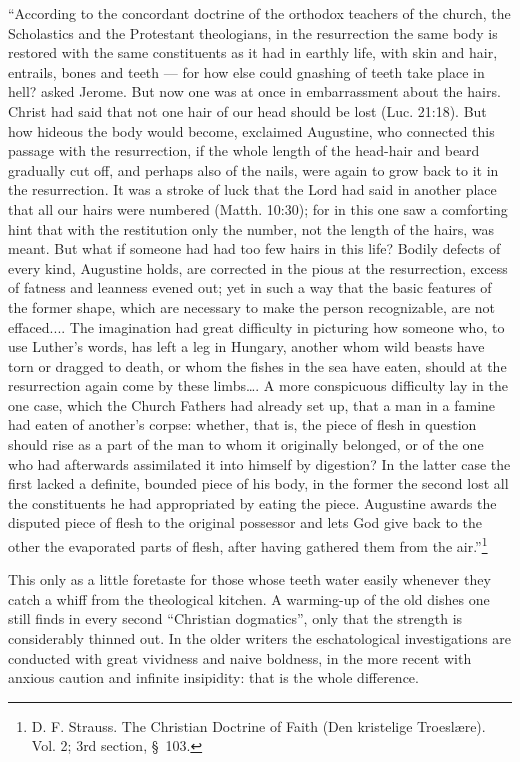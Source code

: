 \documentclass[12pt,a4paper,openany]{book}
\newcommand{\opage}[1]{\marginnote{\footnotesize\textit{[#1]}}}
\begin{document}
``According to the concordant doctrine of the orthodox teachers of the church, the Scholastics and
the Protestant theologians, in the resurrection the same body is restored
with the same constituents as it had in earthly life,
with skin and hair, entrails, bones and teeth --- for how
else could gnashing of teeth take place in hell?
asked Jerome.  But now one was at once in embarrassment about the hairs.  Christ had said that not one hair
of our head should be lost (Luc. 21:18).  But
how hideous the body would become, exclaimed Augustine,
who connected this passage with the resurrection,
if the whole length of the head-hair and beard gradually
cut off, and perhaps also of the nails, were again
to grow back to it in the resurrection.  It was a stroke of luck
that the Lord had said in another place that all our
hairs were numbered (Matth. 10:30); for in this one saw a
comforting hint that with the restitution only
the number, not the length of the hairs, was meant.  But
what if someone had had too few hairs in this life?
Bodily defects of every kind, Augustine holds, are
\setcounter{footnote}{0}%
\opage{210}corrected in the pious at the resurrection, excess of
fatness and leanness evened out; yet in such a way that
the basic features of the former shape, which are necessary
to make the person recognizable, are not effaced....
The imagination had great difficulty in picturing
how someone who, to use Luther's words, has
left a leg in Hungary, another whom wild beasts
have torn or dragged to death, or whom the fishes in the sea
have eaten, should at the resurrection again come by
these limbs\dots{}.  A more conspicuous difficulty
lay in the one case, which the Church Fathers
had already set up, that a man in a famine had
eaten of another's corpse: whether, that is, the piece of flesh in question
should rise as a part of the man to whom
it originally belonged, or of the one who had afterwards assimilated
it into himself by digestion?  In the latter case
the first lacked a definite, bounded piece of
his body, in the former the second lost all the constituents
he had appropriated by eating the piece.  Augustine
awards the disputed piece of flesh to the original possessor
and lets God give back to the other the
evaporated parts of flesh, after having gathered them from
the air.''\footnote[1]{D. F. Strauss.  The Christian Doctrine of Faith (Den kristelige Troeslære).  Vol. 2; 3rd section, \S\ 103.}

This only as a little foretaste for those whose teeth
water easily whenever they catch a whiff
from the theological kitchen.  A warming-up of the old
dishes one still finds in every second ``Christian dogmatics'',
only that the strength is considerably thinned out.  In the
\setcounter{footnote}{0}%
\opage{211}older writers the eschatological investigations are conducted with great vividness
and naive boldness, in the more recent with anxious
caution and infinite insipidity: that is the whole difference.
\end{document}
